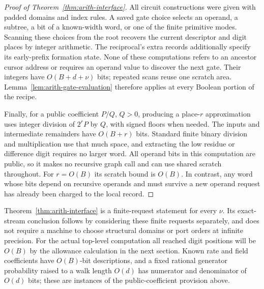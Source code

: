\begin{proof}[Proof of Theorem~\ref{thm:arith-interface}]
All circuit constructions were given with padded domains and
index rules.  A saved gate choice selects an operand, a subtree,
a bit of a known-width word, or one of the finite primitive modes.
Scanning these choices from the root recovers the current
descriptor and digit places by integer arithmetic.  The
reciprocal's extra records additionally specify its early-prefix
formation state.  None of these computations refers to an
ancestor cursor address or requires an operand value to discover
the next gate.  Their integers have $O(B+d+\nu)$ bits; repeated
scans reuse one scratch area.  Lemma~\ref{lem:arith-gate-evaluation}
therefore applies at every Boolean portion of the recipe.

Finally, for a public coefficient $P/Q$, $Q>0$, producing a
place-$r$ approximation uses integer division of $2^rP$ by $Q$,
with signed floors when needed.  The inputs and intermediate
remainders have $O(B+r)$ bits.  Standard finite binary division
and multiplication use that much space, and extracting the
low residue or difference digit requires no larger word.
All operand bits in this computation are public, so it makes no
recursive graph call and can use shared scratch throughout.
For $r=O(B)$ its scratch bound is $O(B)$.  In contrast, any word
whose bits depend on recursive operands and must survive a new
operand request has already been charged to the local record.
\end{proof}

\begin{remark}
\label{rem:arith-clocks}
Theorem~\ref{thm:arith-interface} is a finite-request statement
for every $\nu$.  Its exact-stream conclusion follows by considering
these finite requests separately, and does not require a machine
to choose structural domains or port orders at infinite precision.
For the actual top-level computation all reached digit positions will be
$O(B)$ by the allowance calculation in the next section.  Known
rate and field coefficients have $O(B)$-bit descriptions, and a
fixed rational generator probability raised to a walk length
$O(d)$ has numerator and denominator of $O(d)$ bits; these are
instances of the public-coefficient provision above.
\end{remark}
